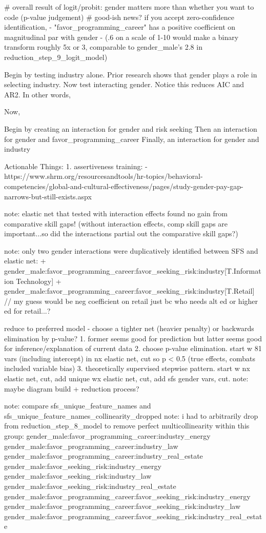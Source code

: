 \documentclass[review]{elsarticle}
\begin{document}
    # overall result of logit/probit: gender matters more than whether you want to code (p-value judgement)
    # good-ish news? if you accept zero-confidence identification,
        - "favor_programming_career" has a positive coefficient on magnitudinal par with gender
        - (.6 on a scale of 1-10 would make a binary transform roughly 5x or 3, comparable to gender_male's 2.8 in reduction_step_9_logit_model)



Begin by testing industry alone. Prior research shows that gender plays a role in selecting industry.
Now test interacting gender. Notice this reduces AIC and AR2. In other words,

Now,

Begin by creating an interaction for gender and risk seeking
Then an interaction for gender and favor_programming_career
Finally, an interaction for gender and industry


Actionable Things:
1.  assertiveness training:
 - https://www.shrm.org/resourcesandtools/hr-topics/behavioral-competencies/global-and-cultural-effectiveness/pages/study-gender-pay-gap-narrows-but-still-exists.aspx

note: elastic net that tested with interaction effects found no gain from comparative skill gaps!
(without interaction effects, comp skill gaps are important...so did the interactions partial out the comparative skill gaps?)


note: only two gender interactions were duplicatively identified between SFS and elastic net:
+ gender_male:favor_programming_career:favor_seeking_risk:industry[T.Information Technology]
+ gender_male:favor_programming_career:favor_seeking_risk:industry[T.Retail]
// my guess would be neg coefficient on retail just bc who needs alt ed or higher ed for retail...?

reduce to preferred model - choose a tighter net (heavier penalty) or backwards elimination by p-value?
1. former seems good for prediction but latter seems good for inference/explanation of current data
2. choose p-value elimination. start w 81 vars (including intercept) in nx elastic net, cut so p < 0.5 (true effects, combats included variable bias)
3. theoretically supervised stepwise pattern. start w nx elastic net, cut, add unique wx elastic net, cut, add sfs gender vars, cut.
note: maybe diagram build + reduction process?

note: compare sfs_unique_feature_names and sfs_unique_feature_names_collinearity_dropped
note: i had to arbitrarily drop from reduction_step_8_model to remove perfect multicollinearity within this group:
gender_male:favor_programming_career:industry_energy
gender_male:favor_programming_career:industry_law
gender_male:favor_programming_career:industry_real_estate
gender_male:favor_seeking_risk:industry_energy
gender_male:favor_seeking_risk:industry_law
gender_male:favor_seeking_risk:industry_real_estate
gender_male:favor_programming_career:favor_seeking_risk:industry_energy
gender_male:favor_programming_career:favor_seeking_risk:industry_law
gender_male:favor_programming_career:favor_seeking_risk:industry_real_estate
\end{document}
